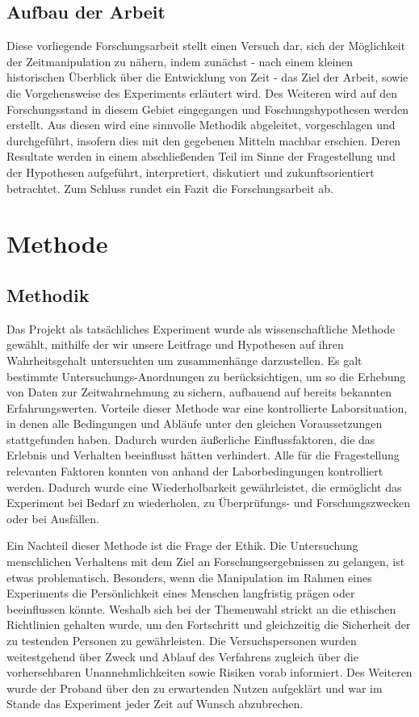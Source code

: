 \documentclass{Paper}
\begin{document}
\subsection{Aufbau der Arbeit}
Diese vorliegende Forschungsarbeit stellt einen Versuch dar, sich der Möglichkeit der Zeitmanipulation zu nähern,  indem zunächst - nach einem kleinen historischen Überblick über die Entwicklung von Zeit - das Ziel der Arbeit, sowie die Vorgehensweise des Experiments erläutert wird. Des Weiteren wird auf den Forschungsstand in diesem Gebiet eingegangen und Foschungshypothesen werden erstellt. Aus diesen wird eine sinnvolle Methodik abgeleitet, vorgeschlagen und durchgeführt, insofern dies mit den gegebenen Mitteln machbar erschien. Deren Resultate werden in einem abschließenden Teil im Sinne der Fragestellung und der Hypothesen aufgeführt, interpretiert, diskutiert und zukunftsorientiert betrachtet. Zum Schluss rundet ein Fazit die Forschungsarbeit ab. 


 
	
\section{Methode}
	\subsection{Methodik}
	
	\par
		Das Projekt als tatsächliches Experiment wurde als wissenschaftliche Methode gewählt, mithilfe
		der wir unsere Leitfrage und Hypothesen auf ihren Wahrheitsgehalt untersuchten um
		zusammenhänge darzustellen. Es galt bestimmte Untersuchungs-Anordnungen zu
		berücksichtigen, um so die Erhebung von Daten zur Zeitwahrnehmung zu sichern, aufbauend
		auf bereits bekannten Erfahrungswerten.
		Vorteile dieser Methode war eine kontrollierte Laborsituation, in denen alle Bedingungen und
		Abläufe unter den gleichen Voraussetzungen stattgefunden haben. Dadurch wurden äußerliche
		Einflussfaktoren, die das Erlebnis und Verhalten beeinflusst hätten verhindert. Alle für die
		Fragestellung relevanten Faktoren konnten von anhand der Laborbedingungen kontrolliert werden.
		Dadurch wurde eine Wiederholbarkeit gewährleistet, die ermöglicht das Experiment bei Bedarf
		zu wiederholen, zu Überprüfungs- und Forschungszwecken oder bei Ausfällen.
		\par
		Ein Nachteil dieser Methode ist die Frage der Ethik. Die Untersuchung menschlichen Verhaltens
		mit dem Ziel an Forschungsergebnissen zu gelangen, ist etwas problematisch. Besonders,
		wenn die Manipulation im Rahmen eines Experiments die Persönlichkeit eines Menschen
		langfristig prägen oder beeinflussen könnte. Weshalb sich bei der Themenwahl strickt an die
		ethischen Richtlinien gehalten wurde, um den Fortschritt und gleichzeitig die Sicherheit der zu
		testenden Personen zu gewährleisten. Die Versuchspersonen wurden weitestgehend über
		Zweck und Ablauf des Verfahrens zugleich über die vorhersehbaren Unannehmlichkeiten sowie
		Risiken vorab informiert. Des Weiteren wurde der Proband über den zu erwartenden Nutzen
		aufgeklärt und war im Stande das Experiment jeder Zeit auf Wunsch abzubrechen.
\end{document}
